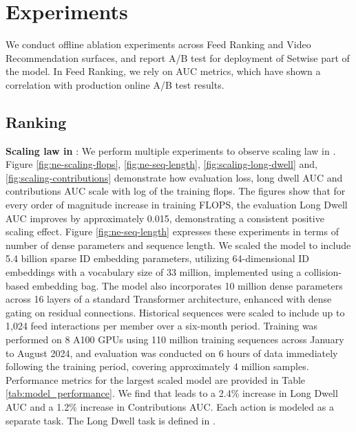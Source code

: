 \section{Experiments} \label{sec:experiments}
We conduct offline ablation experiments across Feed Ranking and Video Recommendation surfaces, and report A/B test for deployment of Setwise part of the model. In Feed Ranking, we rely on AUC metrics, which have shown a correlation with production online A/B test results.
\subsection{Ranking}\label{ranking_experiments}


\textbf{Scaling law in {\systemname}}: We perform multiple experiments to observe scaling law in {\systemname}. Figure \ref{fig:ne-scaling-flops}, \ref{fig:ne-seq-length}, \ref{fig:scaling-long-dwell} and, \ref{fig:scaling-contributions} demonstrate how evaluation loss, long dwell AUC and contributions AUC scale with log of the training flops. The figures show that for every order of magnitude increase in training FLOPS, the evaluation Long Dwell AUC improves by approximately 0.015, demonstrating a consistent positive scaling effect. Figure \ref{fig:ne-seq-length} expresses these experiments in terms of number of dense parameters and sequence length. We scaled the model to include 5.4 billion sparse ID embedding parameters, utilizing 64-dimensional ID embeddings with a vocabulary size of 33 million, implemented using a collision-based embedding bag. The model also incorporates 10 million dense parameters across 16 layers of a standard Transformer architecture, enhanced with dense gating on residual connections. Historical sequences were scaled to include up to 1,024 feed interactions per member over a six-month period. Training was performed on 8 A100 GPUs using 110 million training sequences across January to August 2024, and evaluation was conducted on 6 hours of data immediately following the training period, covering approximately 4 million samples. Performance metrics for the largest scaled model are provided in Table \ref{tab:model_performance}. We find that {\systemname} leads to a 2.4\% increase in Long Dwell AUC and a 1.2\% increase in Contributions AUC. Each action is modeled as a separate task. The Long Dwell task is defined in \cite{dwell_linkedin}.

